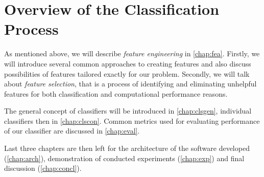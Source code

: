 \section{Overview of the Classification Process}

As mentioned above, we will describe {\it feature engineering} in \autoref{chap:fea}.
Firstly, we will introduce several common approaches to creating features and also discuss possibilities of features tailored exactly for our problem.
Secondly, we will talk about {\it feature selection}, that is a process of identifying and eliminating unhelpful features for both classification and computational performance reasons.

The general concept of classifiers will be introduced in \autoref{chap:clsgen}, individual classifiers then in \autoref{chap:clscon}.
Common metrics used for evaluating performance of our classifier are discussed in \autoref{chap:eval}.

Last three chapters are then left for the architecture of the software developed (\autoref{chap:arch}), demonstration of conducted experiments (\autoref{chap:exp}) and final discussion (\autoref{chap:concl}).
